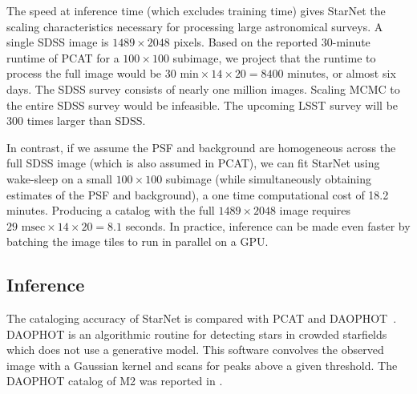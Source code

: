 The speed at inference time (which excludes training time) gives StarNet the scaling characteristics necessary for processing large astronomical surveys. 
A single SDSS image is $1489 \times 2048$ pixels. 
Based on the reported 30-minute runtime of PCAT for a $100\times100$ subimage, we project that
the runtime to process the full image would be $30\text{ min} \times 14 \times 20 = 8400$ minutes, or almost six days. 
The SDSS survey consists of nearly one million images. Scaling MCMC to the entire SDSS survey would be infeasible.
The upcoming LSST survey will be 300 times larger than SDSS.

In contrast, if we assume the PSF and background are homogeneous 
across the full SDSS image (which is also assumed in PCAT), we can 
fit StarNet using wake-sleep 
on a small $100 \times 100$ subimage
(while simultaneously obtaining estimates of the PSF and background),
a one time computational cost of 18.2 minutes. 
Producing a catalog with the full $1489 \times 2048$ image requires
$29\text{ msec} \times 14 \times 20 = 8.1$ seconds. In practice, 
inference can be made even faster by batching the image tiles to run in parallel on a GPU.



\subsection{Inference}
\label{sec:results_on_m2_inference}
The cataloging accuracy of StarNet is compared with PCAT and DAOPHOT~\cite{stetson2987daophot}. 
DAOPHOT is an algorithmic routine for detecting stars in crowded starfields which does not use a generative model. 
This software convolves the observed image with a Gaussian kernel and scans for peaks above a given threshold. 
The DAOPHOT catalog of M2 was reported in \cite{An_2008_m2}. 



